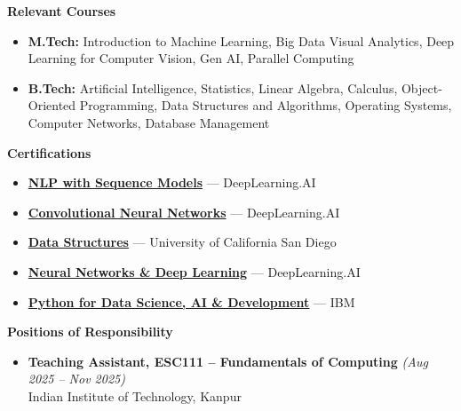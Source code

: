 \documentclass[10pt]{extarticle}
\newcommand{\sectionheader}[1]{
    \vspace{3pt}
    \begin{tcolorbox}
        \textbf{\large #1}
    \end{tcolorbox}
    \vspace{2pt}
}
\begin{document}
\sectionheader{Relevant Courses}
\begin{itemize}
    \item \textbf{M.Tech:} Introduction to Machine Learning, Big Data Visual Analytics, Deep Learning for Computer Vision, Gen AI, Parallel Computing
    \item \textbf{B.Tech:} Artificial Intelligence, Statistics, Linear Algebra, Calculus, Object-Oriented Programming, Data Structures and Algorithms, Operating Systems, Computer Networks, Database Management
\end{itemize}

\sectionheader{Certifications}
\begin{itemize}
    \item \textbf{\href{https://www.coursera.org/account/accomplishments/certificate/TNP63BH8PYW7}{NLP with Sequence Models}} — DeepLearning.AI
    \item \textbf{\href{https://www.coursera.org/account/accomplishments/certificate/UTEFQXRPJP76}{Convolutional Neural Networks}} — DeepLearning.AI
    \item \textbf{\href{https://www.coursera.org/account/accomplishments/certificate/JANNQ88BE859}{Data Structures}} — University of California San Diego
    \item \textbf{\href{https://www.coursera.org/account/accomplishments/certificate/Z3KZ66E3JRSU}{Neural Networks \& Deep Learning}} — DeepLearning.AI
    \item \textbf{\href{https://www.coursera.org/account/accomplishments/certificate/8UCEFE3JR82M}{Python for Data Science, AI \& Development}} — IBM
\end{itemize}

\sectionheader{Positions of Responsibility}
\begin{itemize}
    \item \textbf{Teaching Assistant, ESC111 -- Fundamentals of Computing} \hfill \textit{(Aug 2025 -- Nov 2025)}\\
    Indian Institute of Technology, Kanpur
\end{itemize}
\end{document}
